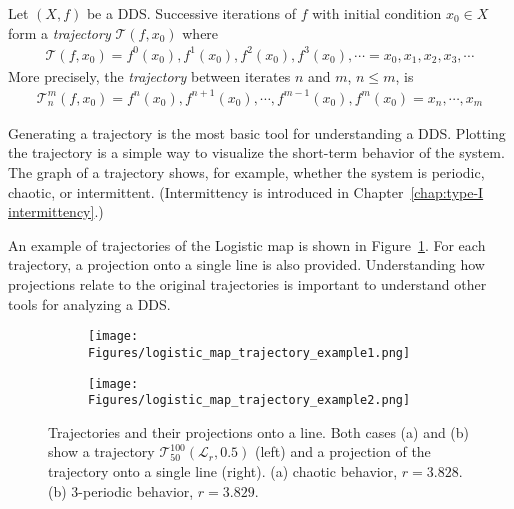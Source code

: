 \begin{definition}[Trajectory]
    Let $\left( X, f \right)$ be a DDS. Successive iterations of $f$ with initial condition $x_0 \in X$ form a \emph{trajectory} $\mathcal{T}(f, x_0)$ where \begin{eqnarray}
        \mathcal{T}(f, x_0) = f^0(x_0), f^1(x_0), f^2(x_0), f^3(x_0), \cdots  = x_0, x_1, x_2, x_3, \cdots
    \end{eqnarray}
    More precisely, the \emph{trajectory} between iterates $n$ and $m$, $n \leq m$, is
    \begin{eqnarray}
        \mathcal{T}_{n}^{m}(f, x_0) = f^{n}(x_0), f^{n+1}(x_0), \cdots, f^{m-1}(x_0), f^{m}(x_0) = x_n, \cdots, x_m
    \end{eqnarray}
\end{definition}

\begin{remark}
    Generating a trajectory is the most basic tool for understanding a DDS.
    Plotting the trajectory is a simple way to visualize the short-term behavior of the system.
    The graph of a trajectory shows, for example, whether the system is periodic, chaotic, or intermittent. (Intermittency is introduced in Chapter~\ref{chap:type-I intermittency}.)
    \par
    An example of trajectories of the Logistic map is shown in Figure~\ref{fig:trajectory_example}.
    For each trajectory, a projection onto a single line is also provided.
    Understanding how projections relate to the original trajectories is important to understand other tools for analyzing a DDS.
\end{remark}

\begin{figure}[!h]
    \centering
    \begin{subfigure}{0.6\textwidth}
        \centering
        \texttt{[image: Figures/logistic\_map\_trajectory\_example1.png]}
        \caption{}
    \end{subfigure}
    \hfill
    \begin{subfigure}{0.6\textwidth}
        \centering
        \texttt{[image: Figures/logistic\_map\_trajectory\_example2.png]}
        \caption{}
    \end{subfigure}

    \caption{
        Trajectories and their projections onto a line.
        Both cases (a) and (b) show a trajectory $\mathcal{T}_{50}^{100}(\mathcal{L}_{r}, 0.5)$ (left) and a projection of the trajectory onto a single line (right). 
        (a) chaotic behavior, $r = 3.828$. 
        (b) $3$-periodic behavior, $r = 3.829$. 
    }
    \label{fig:trajectory_example}
\end{figure}

